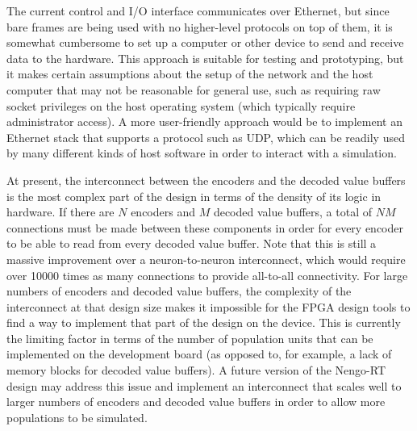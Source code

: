 \documentclass[english]{article}
\newcommand{\design}{Nengo-RT}
\begin{document}
The current control and I/O interface communicates over Ethernet, but since bare frames are being used with no higher-level protocols on top of them,
it is somewhat cumbersome to set up a computer or other device to send and receive data to the hardware.
This approach is suitable for testing and prototyping, but it makes certain assumptions about the setup of the network and the host computer that
may not be reasonable for general use, such as requiring raw socket privileges on the host operating system (which typically require administrator access).
A more user-friendly approach would be to implement an Ethernet stack that supports a protocol such as UDP, which can be readily used by many different
kinds of host software in order to interact with a simulation.

At present, the interconnect between the encoders and the decoded value
buffers is the most complex part of the design in terms of the density of its logic
in hardware. If there are $N$ encoders and $M$ decoded value buffers, a total of
$NM$ connections must be made between these components in order for every
encoder to be able to read from every decoded value buffer.
Note that this is still a massive improvement over a neuron-to-neuron interconnect,
which would require over 10000 times as many connections to provide all-to-all connectivity.
For large numbers of encoders and decoded value buffers, the complexity of the interconnect at
that design size makes it impossible for the FPGA design tools to find a way to
implement that part of the design on the device. This is currently the limiting
factor in terms of the number of population units that can be implemented on
the development board (as opposed to, for example, a lack of memory blocks for
decoded value buffers). A future version of the \design{} design may address
this issue and implement an interconnect that scales well to larger numbers of
encoders and decoded value buffers in order to allow more populations to be
simulated. %
\end{document}
